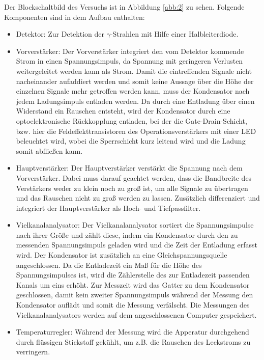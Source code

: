 Der Blockschaltbild des Versuchs ist in Abbildung \ref{abb:2} zu sehen. Folgende
Komponenten sind in dem Aufbau enthalten:
\begin{itemize}
  \item Detektor: Zur Detektion der $\gamma$-Strahlen mit Hilfe
  einer Halbleiterdiode.
  \item Vorverstärker: Der Vorverstärker integriert den vom Detektor
  kommende Strom in einen Spannungsimpuls, da Spannung mit geringeren
  Verlusten weitergeleitet werden kann als Strom. Damit die eintreffenden Signale
  nicht nacheinander aufaddiert werden und somit keine Aussage über die Höhe der
  einzelnen Signale mehr getroffen werden kann, muss der Kondensator nach jedem
  Ladungsimpuls entladen werden. Da durch eine
  Entladung über einen Widerstand ein Rauschen entsteht, wird der Kondensator
  durch eine optoelektronische Rückkopplung entladen, bei der die Gate-Drain-Schicht,
  bzw. hier die Feldeffekttransistoren
  des Operationsverstärkers mit einer LED beleuchtet wird, wobei die
  Sperrschicht kurz leitend wird und die Ladung somit abfließen kann.
  \item Hauptverstärker: Der Hauptverstärker verstärkt die Spannung
  nach dem Vorverstärker. Dabei muss darauf geachtet werden, dass die Bandbreite
  des Verstärkers weder zu klein noch zu groß ist, um alle Signale zu
  übertragen und das Rauschen nicht zu groß werden zu lassen.
  Zusätzlich differenziert und integriert der Hauptverstärker als Hoch- und
  Tiefpassfilter.
  \item Vielkanalanalysator: Der Vielkanalanalysator sortiert
  die Spannungsimpulse nach ihrer Größe und zählt diese, indem ein Kondensator
  durch den zu messenden Spannungsimpuls geladen wird und die Zeit der
  Entladung erfasst wird. Der Kondensator ist zusätzlich an eine
  Gleichspannungsquelle angeschlossen. Da die Entladezeit ein Maß für die
  Höhe des Spannungsimpulses ist, wird die Zählerstelle des zur Entladezeit
  passenden Kanals um eins erhöht. Zur Messzeit wird das Gatter zu dem Kondensator
  geschlossen, damit kein zweiter Spannungsimpuls während der Messung
  den Kondensator auflädt und somit die Messung verfälscht.
  Die Messungen des Vielkanalanalysators werden auf dem angeschlossenen
  Computer gespeichert.
  \item Temperaturregler: Während der Messung wird die Apperatur
  durchgehend durch flüssigen Stickstoff gekühlt, um z.B. die Rauschen des
  Leckstroms zu verringern.
\end{itemize}

